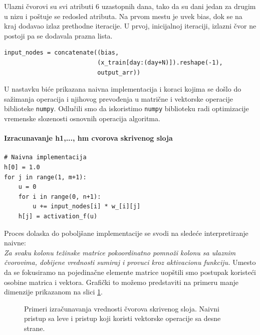 \documentclass[a4paper]{article}
\begin{document}
Ulazni čvorovi su svi atributi 6 uzastopnih dana, tako da su dani jedan za drugim u nizu i poštuje se redosled atributa. Na prvom mestu je uvek bias, dok se na kraj dodavao izlaz prethodne iteracije. U prvoj, inicijalnoj iteraciji, izlazni čvor ne postoji pa se dodavala prazna lista.
\begin{verbatim}
input_nodes = concatenate((bias, 
                          (x_train[day:(day+N)]).reshape(-1), 
                          output_arr))
\end{verbatim}

U nastavku biće prikazana naivna implementacija i koraci kojima se došlo do sažimanja operacija i njihovog prevođenja u matrične i vektorske operacije biblioteke \texttt{numpy}. Odlučili smo da iskoristimo \texttt{numpy} biblioteku radi optimizacije vremenske slozenosti osnovnih operacija algoritma.

\paragraph{Izracunavanje h1,..., hm cvorova skrivenog sloja}
\begin{verbatim}
# Naivna implementacija
h[0] = 1.0
for j in range(1, m+1):
    u = 0
    for i in range(0, n+1):
        u += input_nodes[i] * w_[i][j]
    h[j] = activation_f(u)
\end{verbatim}

Proces dolaska do poboljšane implementacije se svodi na sledeće interpretiranje naivne: \\
{\it Za svaku kolonu težinske matrice pokoordinatno pomnoži kolonu sa ulaznim čvorovima, dobijene vrednosti sumiraj i provuci kroz aktivacionu funkciju.} Umesto da se fokusiramo na pojedinačne elemente matrice uopštili smo postupak koristeći osobine matrica i vektora. Grafički to možemo predstaviti na primeru manje dimenzije prikazanom na slici \ref{fig:izracunavanjewp}.

\begin{figure}[h!]
    \caption{Primeri izračunavanja vrednosti čvorova skrivenog sloja. Naivni pristup sa leve i pristup koji koristi vektorske operacije sa desne strane.}
    \label{fig:izracunavanjewp}
\end{figure}
\end{document}
